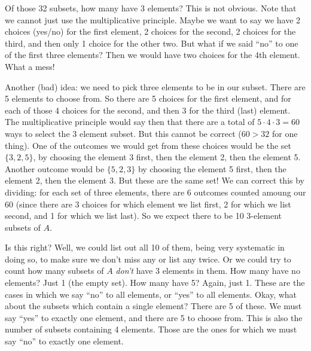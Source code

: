 \documentclass[10pt,]{book}
\theoremstyle{plain}
\theoremstyle{definition}
\theoremstyle{definition}
\theoremstyle{definition}
\numberwithin{equation}{section}
\begin{document}
        Of those 32 subsets, how many have 3 elements? This is not obvious. Note that we cannot just use the multiplicative principle. Maybe we want to say we have 2 choices (yes/no) for the first element, 2 choices for the second, 2 choices for the third, and then only 1 choice for the other two. But what if we said ``no'' to one of the first three elements? Then we would have two choices for the 4th element. What a mess!
\par

        Another (bad) idea: we need to pick three elements to be in our subset. There are 5 elements to choose from. So there are 5 choices for the first element, and for each of those 4 choices for the second, and then 3 for the third (last) element. The multiplicative principle would say then that there are a total of \(5 \cdot 4 \cdot 3 = 60\) ways to select the 3 element subset. But this cannot be correct (\(60 > 32\) for one thing). One of the outcomes we would get from these choices would be the set \(\{3,2,5\}\), by choosing the element 3 first, then the element 2, then the element 5. Another outcome would be \(\{5,2,3\}\) by choosing the element 5 first, then the element 2, then the element 3. But these are the same set! We can correct this by dividing: for each set of three elements, there are 6 outcomes counted amoung our 60 (since there are 3 choices for which element we list first, 2 for which we list second, and 1 for which we list last). So we expect there to be
        10 3-element subsets of \(A\).
\par

        Is this right? Well, we could list out all 10 of them, being very systematic in doing so, to make sure we don't miss any or list any twice. Or we could try to count how many subsets of \(A\) \emph{don't} have 3 elements in them. How many have no elements? Just 1 (the empty set). How many have 5? Again, just 1. These are the cases in which we say ``no'' to all elements, or ``yes'' to all elements. Okay, what about the subsets which contain a single element? There are 5 of these. We must say ``yes'' to exactly one element, and there are 5 to choose from. This is also the number of subsets containing 4 elements. Those are the ones for which we must say ``no'' to exactly one element.
\par
\end{document}
